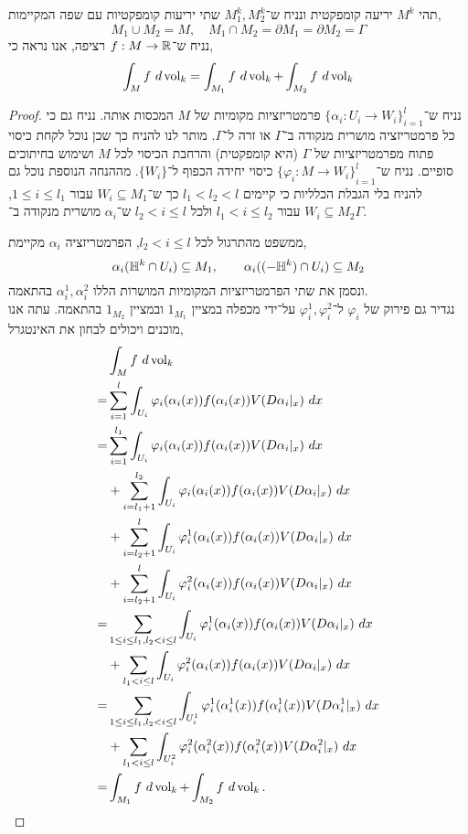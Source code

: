 \question{}
תהי $M^k$ יריעה קומפקטית ונניח ש־$M_1^k, M_2^k$ שתי יריעות קומפקטיות עם שפה המקיימות,
\[
	M_1 \cup M_2 = M,
	\quad
	M_1 \cap M_2
	= \partial M_1
	= \partial M_2
	= \Gamma
\]
נניח ש־$f : M \to \mathbb{R}$ רציפה,
אנו נראה כי,
\[
	\int_M f\ d\operatorname{vol}_k
	= \int_{M_1} f\ d\operatorname{vol}_k
	+ \int_{M_2} f\ d\operatorname{vol}_k
\]
\begin{proof}
	נניח ש־${\{ \alpha_i : U_i \to W_i \}}_{i = 1}^l$ פרמטריזציות מקומיות של $M$ המכסות אותה.
	נניח גם כי כל פרמטריזציה מושרית מנקודה ב־$\Gamma$ או זרה ל־$\Gamma$.
	מותר לנו להניח כך שכן נוכל לקחת כיסוי פתוח מפרמטריזציות של $\Gamma$ (היא קומפקטית) והרחבת הכיסוי לכל $M$ ושימוש בחיתוכים סופיים.
	נניח ש־${\{ \varphi_i : M \to W_i \}}_{i = 1}^l$ כיסוי יחידה הכפוף ל־$\{ W_i \}$.
	מההנחה הנוספת נוכל גם להניח בלי הגבלת הכלליות כי קיימים $l_1 < l_2 < l$ כך ש־$W_i \subseteq M_1$ עבור $1 \le i \le l_1$,
	$W_i \subseteq M_2$ עבור $l_1 < i \le l_2$ ולכל $l_2 < i \le l$ ש־$\alpha_i$ מושרית מנקודה ב־$\Gamma$.

	ממשפט מהתרגול לכל $l_2 < i \le l$, הפרמטריזציה $\alpha_i$ מקיימת,
	\[
		\alpha_i(\mathbb{H}^k \cap U_i) \subseteq M_1,
		\qquad
		\alpha_i((-\mathbb{H}^k) \cap U_i) \subseteq M_2
	\]
	ונסמן את שתי הפרמטריזציות המקומיות המושרות הללו $\alpha_i^1, \alpha_i^2$ בהתאמה. \\
	נגדיר גם פירוק של $\varphi_i$ ל־$\varphi_i^1, \varphi_i^2$ על־ידי מכפלה במציין $1_{M_1}$ ובמציין $1_{M_2}$ בהתאמה.
	עתה אנו מוכנים ויכולים לבחון את האינטגרל,
	\begin{align*}
		& \int_M f\ d\operatorname{vol}_k \\
		= & \sum_{i = 1}^l \int_{U_i} \varphi_i(\alpha_i(x)) f(\alpha_i(x)) V(D \alpha_i |_{x})\ dx \\
		= & \sum_{i = 1}^{l_1} \int_{U_i} \varphi_i(\alpha_i(x)) f(\alpha_i(x)) V(D \alpha_i |_{x})\ dx \\
		  & + \sum_{i = l_1 + 1}^{l_2} \int_{U_i} \varphi_i(\alpha_i(x)) f(\alpha_i(x)) V(D \alpha_i |_{x})\ dx \\
		  & + \sum_{i = l_2 + 1}^{l} \int_{U_i} \varphi_i^1(\alpha_i(x)) f(\alpha_i(x)) V(D \alpha_i |_{x})\ dx \\
		  & + \sum_{i = l_2 + 1}^{l} \int_{U_i} \varphi_i^2(\alpha_i(x)) f(\alpha_i(x)) V(D \alpha_i |_{x})\ dx \\
		= & \sum_{1 \le i \le l_1, l_2 < i \le l} \int_{U_i} \varphi_i^1(\alpha_i(x)) f(\alpha_i(x)) V(D \alpha_i |_{x})\ dx \\
		  & + \sum_{l_1 < i \le l} \int_{U_i} \varphi_i^2(\alpha_i(x)) f(\alpha_i(x)) V(D \alpha_i |_{x})\ dx \\
		= & \sum_{1 \le i \le l_1, l_2 < i \le l} \int_{U_i^1} \varphi_i^1(\alpha_i^1(x)) f(\alpha_i^1(x)) V(D \alpha_i^1 |_{x})\ dx \\
		  & + \sum_{l_1 < i \le l} \int_{U_i^2} \varphi_i^2(\alpha_i^2(x)) f(\alpha_i^2(x)) V(D \alpha_i^2 |_{x})\ dx \\
		= & \int_{M_1} f\ d\operatorname{vol}_k + \int_{M_2} f\ d\operatorname{vol}_k
	.\end{align*}
\end{proof}



